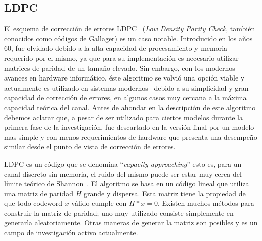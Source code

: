 \subsection{LDPC}
El esquema de corrección de errores LDPC~\cite{gallagerpress} (\textit{Low Density Parity Check}, también conocidos como códigos de Gallager) es un caso notable. Introducido en los años 60, fue olvidado debido a la alta capacidad de procesamiento y memoria requerido por el mismo, ya que para su implementación es necesario utilizar matrices de paridad de un tamaño elevado. Sin embargo, con los modernos avances en hardware informático, éste algoritmo se volvió una opción viable y actualmente es utilizado en sistemas modernos~\cite{brack2007low} debido a su simplicidad y gran capacidad de corrección de errores, en algunos casos muy cercana a la máxima capacidad teórica del canal.
Antes de ahondar en la descripción de este algoritmo debemos aclarar que, a pesar de ser utilizado para ciertos modelos durante la primera fase de la investigación, fue descartado en la versión final por un modelo mas simple y con menos requerimientos de hardware que presenta una desempeño similar desde el punto de vista de corrección de errores.

LDPC es un código que se denomina ``\textit{capacity-approaching}'' esto es, para un canal discreto sin memoria, el ruido del mismo puede ser estar muy cerca del límite teórico de Shannon~\cite{shannon48}.
El algoritmo se basa en un código lineal que utiliza una matriz de paridad $H$ grande y dispersa. Esta matriz tiene la propiedad de que todo codeword $x$ válido cumple con $H*x=0$. 
Existen muchos métodos para construir la matriz de paridad; uno muy utilizado consiste simplemente en generarla aleatoriamente. Otras maneras de generar la matriz son posibles y es un campo de investigación activo actualmente.


